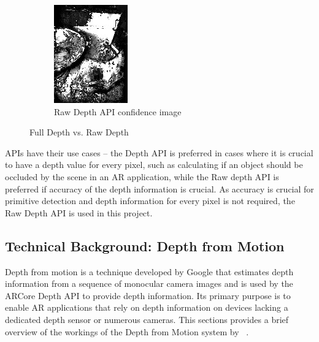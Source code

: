 \begin{figure}[ht!]
\begin{subfigure}[b]{0.4\textwidth}
        \includegraphics[width=0.8\linewidth]{images/depth_raw-depth-confidence-image}
        \caption{Raw Depth API confidence image}
    \end{subfigure}%

    \caption{Full Depth vs. Raw Depth}
    \label{fig:depth-api-images}
\end{figure}
APIs have their use cases --
the Depth API is preferred in cases where it is crucial to have a depth value for every pixel, such as calculating if an object should be occluded by the scene in an AR application,
while the Raw depth API is preferred if accuracy of the depth information is crucial.
As accuracy is crucial for primitive detection and depth information for every pixel is not required, the Raw Depth API is used in this project.

\subsection{Technical Background: Depth from Motion}\label{sec:technical-background-depth-from-motion}
Depth from motion is a technique developed by Google that estimates depth information from a sequence of monocular camera images
and is used by the ARCore Depth API to provide depth information.
Its primary purpose is to enable AR applications that rely on depth information on devices lacking a dedicated depth sensor or numerous cameras.
This sections provides a brief overview of the workings of the Depth from Motion system by ~\parencite{valentin_depth_2018}.

